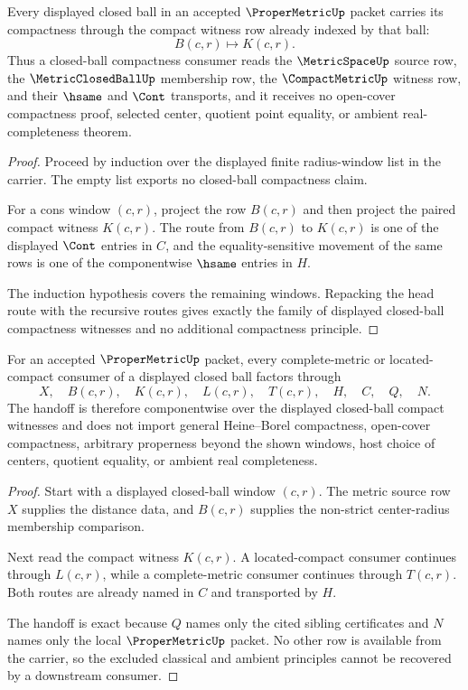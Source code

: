 \begin{theorem}
\label{thm:proper-metric-closed-ball-compactness}
Every displayed closed ball in an accepted $\ProperMetricUp$ packet carries its compactness through the compact witness row already indexed by that ball:
$$
B(c,r)\longmapsto K(c,r).
$$
Thus a closed-ball compactness consumer reads the $\MetricSpaceUp$ source row, the $\MetricClosedBallUp$ membership row, the $\CompactMetricUp$ witness row, and their $\hsame$ and $\Cont$ transports, and it receives no open-cover compactness proof, selected center, quotient point equality, or ambient real-completeness theorem.
\end{theorem}
\begin{proof}
Proceed by induction over the displayed finite radius-window list in the carrier. The empty list exports no closed-ball compactness claim.

For a cons window $(c,r)$, project the row $B(c,r)$ and then project the paired compact witness $K(c,r)$. The route from $B(c,r)$ to $K(c,r)$ is one of the displayed $\Cont$ entries in $C$, and the equality-sensitive movement of the same rows is one of the componentwise $\hsame$ entries in $H$.

The induction hypothesis covers the remaining windows. Repacking the head route with the recursive routes gives exactly the family of displayed closed-ball compactness witnesses and no additional compactness principle.
\end{proof}

\begin{theorem}
\label{thm:proper-metric-complete-located-handoff}
For an accepted $\ProperMetricUp$ packet, every complete-metric or located-compact consumer of a displayed closed ball factors through
$$
X,\quad B(c,r),\quad K(c,r),\quad L(c,r),\quad T(c,r),\quad H,\quad C,\quad Q,\quad N .
$$
The handoff is therefore componentwise over the displayed closed-ball compact witnesses and does not import general Heine--Borel compactness, open-cover compactness, arbitrary properness beyond the shown windows, host choice of centers, quotient equality, or ambient real completeness.
\end{theorem}
\begin{proof}
Start with a displayed closed-ball window $(c,r)$. The metric source row $X$ supplies the distance data, and $B(c,r)$ supplies the non-strict center-radius membership comparison.

Next read the compact witness $K(c,r)$. A located-compact consumer continues through $L(c,r)$, while a complete-metric consumer continues through $T(c,r)$. Both routes are already named in $C$ and transported by $H$.

The handoff is exact because $Q$ names only the cited sibling certificates and $N$ names only the local $\ProperMetricUp$ packet. No other row is available from the carrier, so the excluded classical and ambient principles cannot be recovered by a downstream consumer.
\end{proof}

